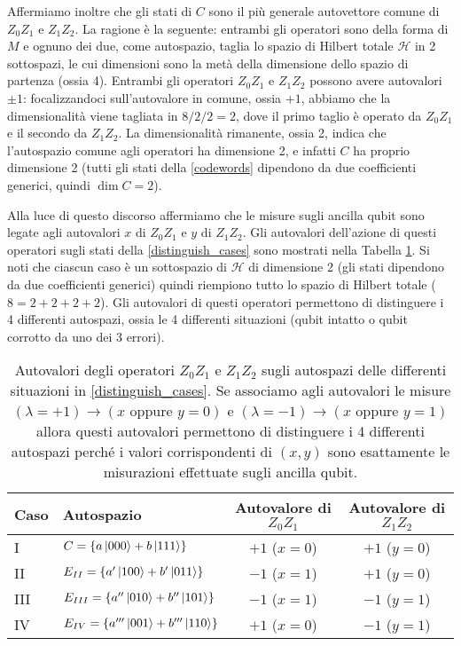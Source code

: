 \noindent Affermiamo inoltre che gli stati di $C$ sono il più generale autovettore comune di $Z_0 Z_1$ e $Z_1 Z_2$. La ragione è la seguente: entrambi gli operatori sono della forma di $M$ e ognuno dei due, come autospazio, taglia lo spazio di Hilbert totale $\mathcal{H}$ in 2 sottospazi, le cui dimensioni sono la metà della dimensione dello spazio di partenza (ossia 4). Entrambi gli operatori $Z_0 Z_1$ e $Z_1 Z_2$ possono avere autovalori $\pm 1$: focalizzandoci sull'autovalore in comune, ossia $+1$, abbiamo che la dimensionalità viene tagliata in $8/2/2 = 2$, dove il primo taglio è operato da $Z_0 Z_1$ e il secondo da $Z_1 Z_2$. La dimensionalità rimanente, ossia 2, indica che l'autospazio comune agli operatori ha dimensione 2, e infatti $C$ ha proprio dimensione 2 (tutti gli stati della \eqref{codewords} dipendono da due coefficienti generici, quindi $\dim C = 2$). 

\noindent Alla luce di questo discorso affermiamo che le misure sugli ancilla qubit sono legate agli autovalori $x$ di $Z_0 Z_1$ e $y$ di $Z_1 Z_2$. Gli autovalori dell'azione di questi operatori sugli stati della \eqref{distinguish_cases} sono mostrati nella Tabella \ref{tab:eigs_ZZ}. Si noti che ciascun caso è un sottospazio di $\mathcal{H}$ di dimensione 2 (gli stati dipendono da due coefficienti generici) quindi riempiono tutto lo spazio di Hilbert totale ($8 = 2 + 2 + 2 +2$). 
Gli autovalori di questi operatori permettono di distinguere i 4 differenti autospazi, ossia le 4 differenti situazioni (qubit intatto o qubit corrotto da uno dei 3 errori).

\begin{table}[!ht]
	\centering
    \begin{tabular}{llcc}
        \toprule
        Caso & Autospazio & Autovalore di $Z_0 Z_1$ & Autovalore di $Z_1 Z_2$ \\
        \midrule
        I & $C = \{ a \ket{000} + b \ket{111} \}$ & $+1$ ($x=0$) & $+1$ ($y=0$) \\
        II & $E_{II} = \{ a' \ket{100} + b' \ket{011} \}$ & $-1$ ($x=1$) & $+1$ ($y=0$) \\
        III & $E_{III} = \{ a'' \ket{010} + b'' \ket{101} \}$ & $-1$ ($x=1$) & $-1$ ($y=1$) \\
        IV & $E_{IV} = \{ a''' \ket{001} + b''' \ket{110} \}$ & $+1$ ($x=0$) & $-1$ ($y=1$) \\
        \bottomrule
    \end{tabular}\\
    \caption{Autovalori degli operatori $Z_0 Z_1$ e $Z_1 Z_2$ sugli autospazi delle differenti situazioni in \eqref{distinguish_cases}. Se associamo agli autovalori le misure $(\lambda = +1) \to (x \text{ oppure } y = 0)$ e $(\lambda = -1) \to (x \text{ oppure } y = 1)$ allora questi autovalori permettono di distinguere i 4 differenti autospazi perché i valori corrispondenti di $(x,y)$ sono esattamente le misurazioni effettuate sugli ancilla qubit.}
    \label{tab:eigs_ZZ}
\end{table}

